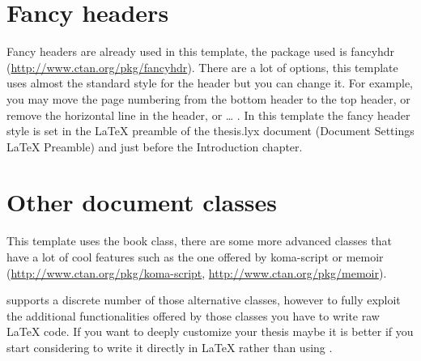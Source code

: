 \section{Fancy headers}

Fancy headers are already used in this template, the package used
is \textsf{fancyhdr} (\textsf{\url{http://www.ctan.org/pkg/fancyhdr}}).
There are a lot of options, this template uses almost the standard
style for the header but you can change it. For example, you may move
the page numbering from the bottom header to the top header, or remove
the horizontal line in the header, or \ldots{} . In this template the
fancy header style is set in the \LaTeX{} preamble of the \textsf{thesis.lyx}
document (\textsf{Document} \textsf{\lyxarrow} \textsf{Settings}
\textsf{\lyxarrow} \textsf{\LaTeX{} Preamble}) and just before the
\textsf{Introduction} chapter.

\section{Other document classes}

This template uses the \textsf{book} class, there are some more advanced
classes that have a lot of cool features such as the one offered by
\textsf{koma-script} or \textsf{memoir} (\textsf{\url{http://www.ctan.org/pkg/koma-script}},
\textsf{\url{http://www.ctan.org/pkg/memoir}}).

\LyX{} supports a discrete number of those alternative classes, however
to fully exploit the additional functionalities offered by those classes
you have to write raw \LaTeX{} code. If you want to deeply customize
your thesis maybe it is better if you start considering to write it
directly in \LaTeX{} rather than using \LyX .
